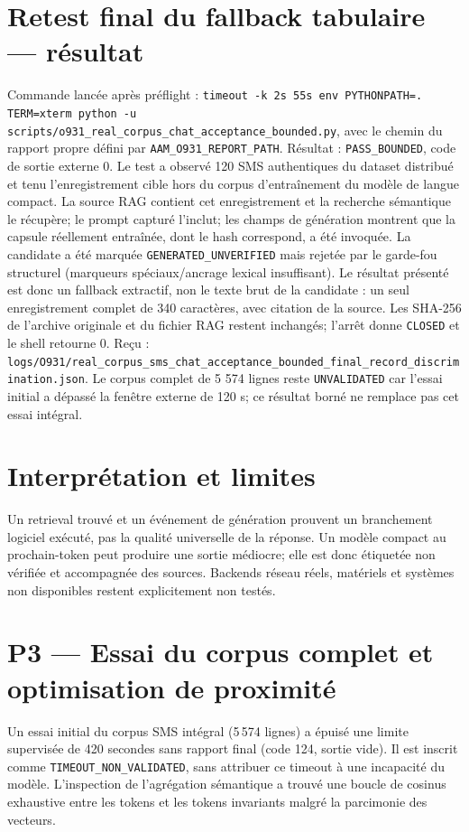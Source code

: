 \documentclass[11pt,a4paper]{article}
\begin{document}
\section{Retest final du fallback tabulaire — résultat}
Commande lancée après préflight : \texttt{timeout -k 2s 55s env PYTHONPATH=. TERM=xterm python -u scripts/o931\_real\_corpus\_chat\_acceptance\_bounded.py}, avec le chemin du rapport propre défini par \texttt{AAM\_O931\_REPORT\_PATH}. Résultat : \texttt{PASS\_BOUNDED}, code de sortie externe 0. Le test a observé 120 SMS authentiques du dataset distribué et tenu l'enregistrement cible hors du corpus d'entraînement du modèle de langue compact. La source RAG contient cet enregistrement et la recherche sémantique le récupère; le prompt capturé l'inclut; les champs de génération montrent que la capsule réellement entraînée, dont le hash correspond, a été invoquée. La candidate a été marquée \texttt{GENERATED\_UNVERIFIED} mais rejetée par le garde-fou structurel (marqueurs spéciaux/ancrage lexical insuffisant). Le résultat présenté est donc un fallback extractif, non le texte brut de la candidate : un seul enregistrement complet de 340 caractères, avec citation de la source. Les SHA-256 de l'archive originale et du fichier RAG restent inchangés; l'arrêt donne \texttt{CLOSED} et le shell retourne 0. Reçu : \texttt{logs/O931/real\_corpus\_sms\_chat\_acceptance\_bounded\_final\_record\_discrimination.json}. Le corpus complet de 5 574 lignes reste \texttt{UNVALIDATED} car l'essai initial a dépassé la fenêtre externe de 120 s; ce résultat borné ne remplace pas cet essai intégral.
\section{Interprétation et limites}
Un retrieval trouvé et un événement de génération prouvent un branchement logiciel exécuté, pas la qualité universelle de la réponse. Un modèle compact au prochain-token peut produire une sortie médiocre; elle est donc étiquetée non vérifiée et accompagnée des sources. Backends réseau réels, matériels et systèmes non disponibles restent explicitement non testés.

\section{P3 — Essai du corpus complet et optimisation de proximité}
Un essai initial du corpus SMS intégral (5\,574 lignes) a épuisé une limite supervisée de 420 secondes sans rapport final (code 124, sortie vide). Il est inscrit comme \texttt{TIMEOUT\_NON\_VALIDATED}, sans attribuer ce timeout à une incapacité du modèle. L'inspection de l'agrégation sémantique a trouvé une boucle de cosinus exhaustive entre les tokens et les tokens invariants malgré la parcimonie des vecteurs.
\end{document}
